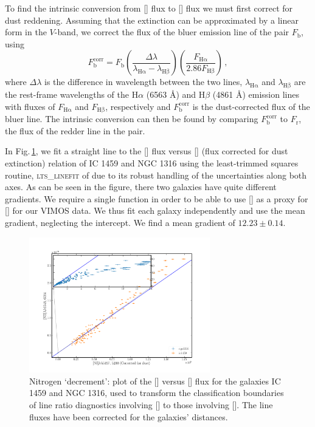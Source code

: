 		To find the intrinsic conversion from [] flux to [] flux we must first correct for dust reddening. Assuming that the extinction can be approximated by a linear form in the $V$-band, we correct the flux of the bluer emission line of the pair $F_\mathrm{b}$, using
		\begin{equation}
			F^\mathrm{corr}_\mathrm{b} = F_\mathrm{b} \left(\frac{\Delta\lambda}{\lambda_\mathrm{H\alpha} - \lambda_\mathrm{H\beta}}\right) \left(\frac{F_\mathrm{H\alpha}}{2.86 F_\mathrm{H\beta}}\right) \, ,
		\end{equation}
		where $\Delta\lambda$ is the difference in wavelength between the two lines, $\lambda_\mathrm{H\alpha}$ and $\lambda_\mathrm{H\beta}$ are the rest-frame wavelengths of the H$\alpha$ (6563 \AA) and H$\beta$ (4861 \AA) emission lines with fluxes of $F_\mathrm{H\alpha}$ and $F_\mathrm{H\beta}$, respectively and $F^\mathrm{corr}_\mathrm{b}$ is the dust-corrected flux of the bluer line. The intrinsic conversion can then be found by comparing $F^\mathrm{corr}_\mathrm{b}$ to $F_\mathrm{r}$, the flux of the redder line in the pair. 

		In Fig.\,\ref{fig:NII_NI}, we fit a straight line to the [] flux versus [] (flux corrected for dust extinction) relation of IC 1459 and NGC 1316 using the least-trimmed squares routine, \textsc{lts\_linefit} of \citet{Cappellari2013} due to its robust handling of the uncertainties along both axes. 
		As can be seen in the figure, there two galaxies have quite different gradients. We require a single function in order to be able to use [] as a proxy for [] for our VIMOS data. We thus fit each galaxy independently and use the mean gradient, neglecting the intercept. We find a mean gradient of $12.23 \pm 0.14$.

		\begin{figure}
			\centering
			\includegraphics[width=0.7\textwidth]{chapter5/NII_NI_ratio.png}
			\caption[The nitrogen `decrement']{Nitrogen `decrement': plot of the [] versus [] flux for the galaxies IC 1459 and NGC 1316, used to transform the classification boundaries of line ratio diagnostics involving [] to those involving []. The line fluxes have been corrected for the galaxies' distances.} 
			\label{fig:NII_NI}
		\end{figure}

